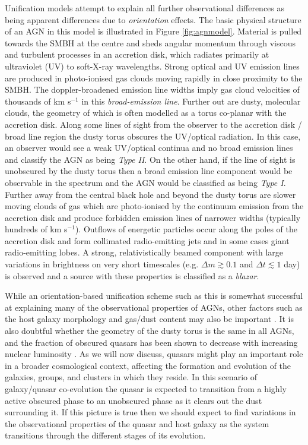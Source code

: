 Unification models attempt to explain all further observational differences as being apparent differences due to {\it orientation} effects. The basic physical structure of an AGN in this model is illustrated in Figure \ref{fig:agnmodel}. Material is pulled towards the SMBH at the centre and sheds angular momentum through viscous and turbulent processes in an accretion disk, which radiates primarily at ultraviolet (UV) to soft-X-ray wavelengths. Strong optical and UV emission lines are produced in photo-ionised gas clouds moving rapidly in close proximity to the SMBH. The doppler-broadened emission line widths imply gas cloud velocities of thousands of km s$^{-1}$ in this {\it broad-emission line}. Further out are dusty, molecular clouds, the geometry of which is often modelled as a torus co-planar with the accretion disk. Along some lines of sight from the observer to the accretion disk / broad line region the dusty torus obscures the UV/optical radiation. In this case, an observer would see a weak UV/optical continua and no broad emission lines and classify the AGN as being {\it Type II}. On the other hand, if the line of sight is unobscured by the dusty torus then a broad emission line component would be observable in the spectrum and the AGN would be classified as being {\it Type I}. Further away from the central black hole and beyond the dusty torus are slower moving clouds of gas which are photo-ionised by the continuum emission from the accretion disk and produce forbidden emission lines of narrower widths (typically hundreds of km s$^{-1}$). Outflows of energetic particles occur along the poles of the accretion disk and form collimated radio-emitting jets and in some cases giant radio-emitting lobes. A strong, relativistically beamed component with large variations in brightness on very short timescales (e.g. ${\Delta}m \gtrsim 0.1$ and $\Delta t \lesssim 1$ day) is observed and a source with these properties is classified as a {\it blazar}. 

While an orientation-based unification scheme such as this is somewhat successful at explaining many of the observational properties of AGNs, other factors such as the host galaxy morphology and gas/dust content may also be important \citep{peterson95}. It is also doubtful whether the geometry of the dusty torus is the same in all AGNs, and the fraction of obscured quasars has been shown to decrease with increasing nuclear luminosity \citep{lawrence91}. As we will now discuss, quasars might play an important role in a broader cosmological context, affecting the formation and evolution of the galaxies, groups, and clusters in which they reside. In this scenario of galaxy/quasar co-evolution the quasar is expected to transition from a highly active obscured phase to an unobscured phase as it clears out the dust surrounding it. If this picture is true then we should expect to find variations in the observational properties of the quasar and host galaxy as the system transitions through the different stages of its evolution.  

